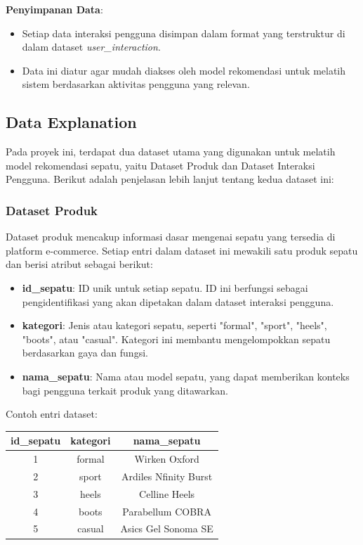 \documentclass[journal,article,submit,pdftex,moreauthors]{Definitions/mdpi}
\begin{document}
    \item \textbf{Penyimpanan Data}:
    \begin{itemize}
        \item Setiap data interaksi pengguna disimpan dalam format yang terstruktur di dalam dataset \textit{user\_interaction}.
        \item Data ini diatur agar mudah diakses oleh model rekomendasi untuk melatih sistem berdasarkan aktivitas pengguna yang relevan.
    \end{itemize}



\subsection{Data Explanation}
Pada proyek ini, terdapat dua dataset utama yang digunakan untuk melatih model rekomendasi sepatu, yaitu Dataset Produk dan Dataset Interaksi Pengguna. Berikut adalah penjelasan lebih lanjut tentang kedua dataset ini:

\subsubsection{Dataset Produk}
Dataset produk mencakup informasi dasar mengenai sepatu yang tersedia di platform e-commerce. Setiap entri dalam dataset ini mewakili satu produk sepatu dan berisi atribut sebagai berikut:

\begin{itemize}
    \item \textbf{id\_sepatu}: ID unik untuk setiap sepatu. ID ini berfungsi sebagai pengidentifikasi yang akan dipetakan dalam dataset interaksi pengguna.
    \item \textbf{kategori}: Jenis atau kategori sepatu, seperti "formal", "sport", "heels", "boots", atau "casual". Kategori ini membantu mengelompokkan sepatu berdasarkan gaya dan fungsi.
    \item \textbf{nama\_sepatu}: Nama atau model sepatu, yang dapat memberikan konteks bagi pengguna terkait produk yang ditawarkan.
\end{itemize}

Contoh entri dataset:

\begin{table}[h]
\centering
\begin{tabular}{|c|c|c|}
\hline
\textbf{id\_sepatu} & \textbf{kategori} & \textbf{nama\_sepatu} \\ \hline
1 & formal & Wirken Oxford \\ \hline
2 & sport & Ardiles Nfinity Burst \\ \hline
3 & heels & Celline Heels \\ \hline
4 & boots & Parabellum COBRA \\ \hline
5 & casual & Asics Gel Sonoma SE \\ \hline
\end{tabular}
\end{table}
\end{document}
